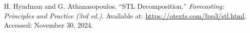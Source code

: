 \begin{thebibliography}{99} %

  H. Hyndman and G. Athanasopoulos. 
  ``STL Decomposition,'' 
  \textit{Forecasting: Principles and Practice (3rd ed.)}. 
  Available at: \url{https://otexts.com/fpp3/stl.html}. 
  Accessed: November 30, 2024.

\end{thebibliography}